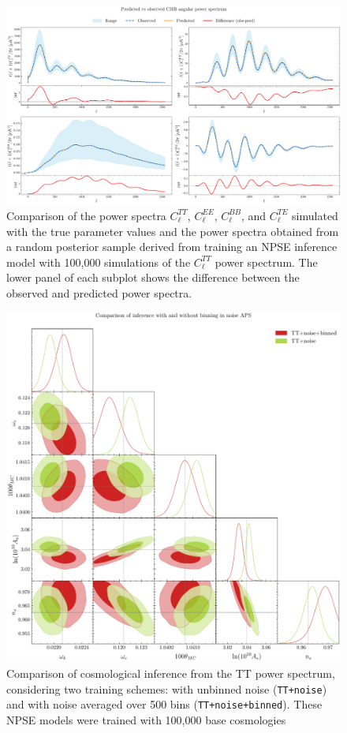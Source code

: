 \begin{figure}
    \centering
    \includegraphics[scale=0.225]{img/cmb_aps_pred_vs_obs_0.pdf}
    \caption{Comparison of the power spectra $C_{\ell}^{TT}$, $C_{\ell}^{EE}$, $C_{\ell}^{BB}$, and $C_{\ell}^{TE}$ simulated with the true parameter values and the power spectra obtained from a random posterior sample derived from training an NPSE inference model with 100,000 simulations of the $C_{\ell}^{TT}$ power spectrum. The lower panel of each subplot shows the difference between the observed and predicted power spectra.} 
    \label{fig:pred_vs_obs}
\end{figure}

\begin{figure}
    \centering
    \includegraphics[scale=0.35]{img/inference_with_noise.pdf}
    \caption{Comparison of cosmological inference from the TT power spectrum, considering two training schemes: with unbinned noise (\texttt{TT+noise}) 
    and with noise averaged over 500 bins (\texttt{TT+noise+binned}). These NPSE models were trained with 100,000 base cosmologies}
    \label{fig:nsims_comparison}
\end{figure}